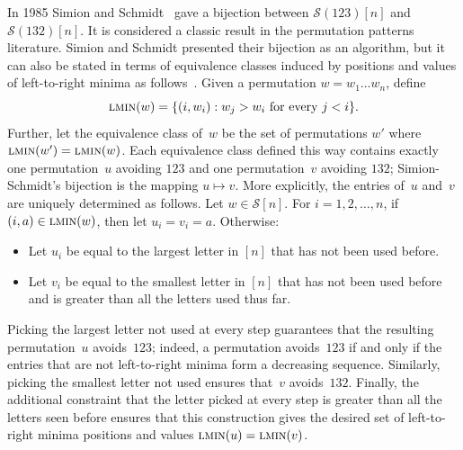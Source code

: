 \documentclass[a4paper, 11pt]{article}
\newcommand{\Sym}{\mathcal{S}}
\newcommand{\ltrmin}{\textsc{lmin}}
\theoremstyle{definition}
\begin{document}

In 1985 Simion and Schmidt~\cite{simionschmidt} gave a
bijection between $\Sym(123)[n]$ and $\Sym(132)[n]$.
It is considered a classic result
in the permutation patterns literature. Simion and Schmidt presented their
bijection as an algorithm, but it can also be stated in
terms of equivalence classes induced by positions and values of
left-to-right minima as follows~\cite{ClKi2008}. Given a permutation
$w=w_1\ldots w_n$, define
$$
\ltrmin(w) = \{ (i,w_i): w_j > w_i\text{ for every $j<i$}\}.
$$
Further, let the equivalence class of~$w$ be the set of permutations
$w'$ where $\ltrmin(w')=\ltrmin(w)$. Each equivalence class defined
this way contains exactly one permutation~$u$ avoiding $123$ and
one permutation~$v$ avoiding $132$; Simion-Schmidt's bijection
is the mapping $u\mapsto v$.
More explicitly, the entries of~$u$ and~$v$
are uniquely determined as follows. Let $w\in\Sym[n]$.
For $i=1,2,\ldots,n$, if $(i,a)\in \ltrmin(w)$, then let $u_i=v_i=a$. Otherwise:
\begin{itemize}
\item Let $u_i$ be equal to the largest letter in $[n]$ that has not been
used before.
\item Let $v_i$ be equal to the smallest letter in $[n]$ that has not been
used before and is greater than all the letters used thus far.
\end{itemize}
Picking the largest letter not used at every step guarantees that the
resulting permutation~$u$ avoids~$123$; indeed, a permutation avoids~$123$
if and only if the entries that are not left-to-right minima form a
decreasing sequence. Similarly, picking the smallest letter not used
ensures that~$v$ avoids~$132$. Finally, the additional constraint that
the letter picked at every step is greater than all the letters seen
before ensures that this construction gives the desired set of
left-to-right minima positions and values $\ltrmin(u)=\ltrmin(v)$.
\end{document}
